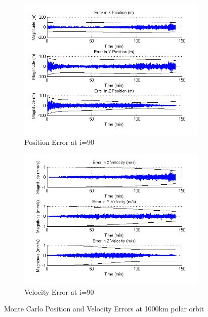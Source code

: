 \documentclass[]{aiaa-tc}%
\begin{document}
\begin{figure}[ht!]
\centering
\begin{subfigure}{.5\textwidth}
  \centering
  \includegraphics[width=0.9\linewidth]{MC_pos}
  \caption{Position Error at i=90\degree}
  \label{fig:mcpos}
\end{subfigure}%
\begin{subfigure}{.5\textwidth} 
  \centering
  \includegraphics[width=0.9\linewidth]{MC_vel}
  \caption{Velocity Error at i=90\degree}
  \label{fig:coastline}
\end{subfigure}
\caption{Monte Carlo Position and Velocity Errors at 1000km polar orbit}
\label{fig:mcvel}
\end{figure}
%
\end{document}
